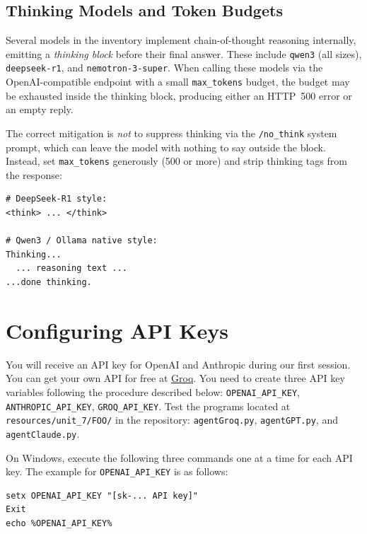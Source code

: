 \subsection{Thinking Models and Token Budgets}

Several models in the inventory implement chain-of-thought reasoning
internally, emitting a \emph{thinking block} before their final answer.
These include \texttt{qwen3} (all sizes), \texttt{deepseek-r1}, and
\texttt{nemotron-3-super}. When calling these models via the
OpenAI-compatible endpoint with a small \texttt{max\_tokens} budget, the
budget may be exhausted inside the thinking block, producing either an
HTTP~500 error or an empty reply.

The correct mitigation is \emph{not} to suppress thinking via the
\texttt{/no\_think} system prompt, which can leave the model with nothing
to say outside the block. Instead, set \texttt{max\_tokens} generously
(500 or more) and strip thinking tags from the response:

\begin{lstlisting}[style=bashstyle, caption={Thinking tag patterns to strip from model output}]
# DeepSeek-R1 style:
<think> ... </think>

# Qwen3 / Ollama native style:
Thinking...
  ... reasoning text ...
...done thinking.
\end{lstlisting}

\section{Configuring API Keys}
\label{sec:apikeys}

You will receive an API key for OpenAI and Anthropic during our first session. You can get your own API for free at \href{https://groq.com}{Groq}. You need to create three API key variables following the procedure described below: \texttt{OPENAI\_API\_KEY}, \texttt{ANTHROPIC\_API\_KEY}, \texttt{GROQ\_API\_KEY}. Test the programs located at \texttt{resources/unit\_7/FOO/} in the \ProjectName{} repository: \texttt{agentGroq.py}, \texttt{agentGPT.py}, and \texttt{agentClaude.py}.

\vs

On Windows, execute the following three commands one at a time for each API key. The example for \texttt{OPENAI\_API\_KEY} is as follows:

\begin{verbatim}
setx OPENAI_API_KEY "[sk-... API key]"
Exit
echo %OPENAI_API_KEY%
\end{verbatim}

